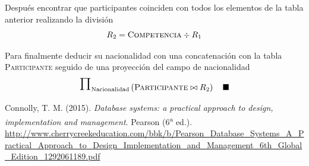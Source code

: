 \documentclass[a4paper, twoside, 12pt]{article}
\newcommand{\tblstr}[1]{\mathrm{\textsc{#1}}}
\newcommand{\project}[2]{\makebox{\huge\ensuremath{\Pi}}_{\mathrm{#1}} \left( #2 \right)}
\begin{document}
Después encontrar que participantes coinciden con todos los elementos de la tabla anterior realizando la división
\begin{equation*}
    R_{2} = \tblstr{Competencia} \div R_{1}
\end{equation*}

Para finalmente deducir su nacionalidad con una concatenación con la tabla \textsc{Participante} seguido de una proyección del campo de nacionalidad
\begin{equation*}
   \project
       {\mathrm{Nacionalidad}}
       {\tblstr{Participante} \bowtie R_{2}} \quad \blacksquare
\end{equation*}
\clearpage

\begin{thebibliography}{99}

Connolly, T. M. (2015). \textit{Database systems: a practical approach to design, implementation and management}. Pearson (6\textsuperscript{a} ed.). \url{http://www.cherrycreekeducation.com/bbk/b/Pearson_Database_Systems_A_Practical_Approach_to_Design_Implementation_and_Management_6th_Global_Edition_1292061189.pdf}

\end{thebibliography}
\end{document}

